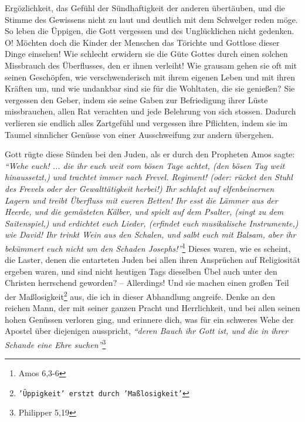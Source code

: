 Ergözlichkeit, das Gefühl der Sündhaftigkeit der anderen
übertäuben, und die
Stimme des Gewissens nicht zu laut und deutlich mit
dem Schwelger
reden möge. So
leben die Üppigen, die Gott vergessen und des Unglücklichen nicht gedenken. O!
Möchten doch die Kinder der Menschen das Törichte und Gottlose dieser Dinge
einsehen! Wie schlecht erwidern sie die Güte Gottes durch einen solchen
Missbrauch des Überflusses, den er ihnen verleiht! Wie grausam gehen sie oft
mit seinen Geschöpfen, wie verschwenderisch mit ihrem
eigenen Leben und mit
ihren Kräften um, und wie undankbar sind sie für die Wohltaten,
die sie
genießen? Sie vergessen den Geber, indem sie seine Gaben zur Befriedigung ihrer
Lüste missbrauchen, allen Rat verachten und jede Belehrung von sich stossen.
Dadurch verlieren sie endlich alles Zartgefühl und vergessen ihre
Pflichten,
indem sie im Taumel sinnlicher Genüsse von einer Ausschweifung zur andern
übergehen.

\medskip

Gott rügte diese Sünden bei den Juden, als er durch den
Propheten Amos sagte:
\textit{"`Wehe euch! ... die ihr euch weit vom bösen Tage achtet, (den bösen Tag
weit
hinaussetzt,) und trachtet immer nach Frevel. Regiment! (oder: rücket den Stuhl
des Frevels oder der Gewalttätigkeit herbei!) Ihr schlafet auf elfenbeinernen
Lagern und treibt Überfluss mit eueren Betten! Ihr esst die Lämmer aus der
Heerde, und die gemästeten Kälber, und spielt auf dem Psalter, (singt zu dem
Saitenspiel,) und erdichtet euch Lieder, (erfindet euch musikalische
Instrumente,) wie David! Ihr trinkt Wein aus den Schalen, und salbt euch mit
Balsam, aber ihr bekümmert euch nicht um den Schaden Josephs!"'}\footnote{Amos
6,3-6}
Dieses waren, wie es scheint, die Laster, denen die entarteten
Juden bei allen ihren Ansprüchen auf
Religiosität ergeben waren,
und sind nicht
heutigen Tags dieselben Übel auch unter den Christen
herrschend geworden? --
Allerdings! Und sie machen einen großen Teil der
Maßlosigkeit\footnote{\texttt{'Üppigkeit' erstzt
durch 'Maßlosigkeit'}} aus, die ich in
dieser Abhandlung angreife. Denke an den reichen Mann, der mit seiner ganzen
Pracht und Herrlichkeit, und bei allen seinen hohen Genüssen verloren ging, und
erinnere dich, was für ein schweres Wehe der Apostel über diejenigen ausspricht,
\textit{"`deren Bauch ihr Gott ist, und die in ihrer Schande eine Ehre
suchen"'}\footnote{Philipper 5,19}

